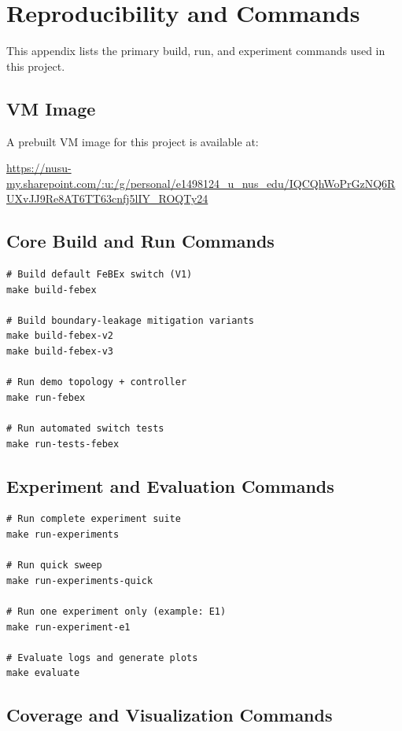 \section{Reproducibility and Commands}
\label{sec:appendix-commands}

This appendix lists the primary build, run, and experiment commands used in this project.

\subsection{VM Image}

A prebuilt VM image for this project is available at:
\begin{center}
\url{https://nusu-my.sharepoint.com/:u:/g/personal/e1498124_u_nus_edu/IQCQhWoPrGzNQ6RUXvJJ9Re8AT6TT63cnfj5lIY_ROQTy24}
\end{center}

\subsection{Core Build and Run Commands}

\begin{verbatim}
# Build default FeBEx switch (V1)
make build-febex

# Build boundary-leakage mitigation variants
make build-febex-v2
make build-febex-v3

# Run demo topology + controller
make run-febex

# Run automated switch tests
make run-tests-febex
\end{verbatim}

\subsection{Experiment and Evaluation Commands}

\begin{verbatim}
# Run complete experiment suite
make run-experiments

# Run quick sweep
make run-experiments-quick

# Run one experiment only (example: E1)
make run-experiment-e1

# Evaluate logs and generate plots
make evaluate
\end{verbatim}

\subsection{Coverage and Visualization Commands}

